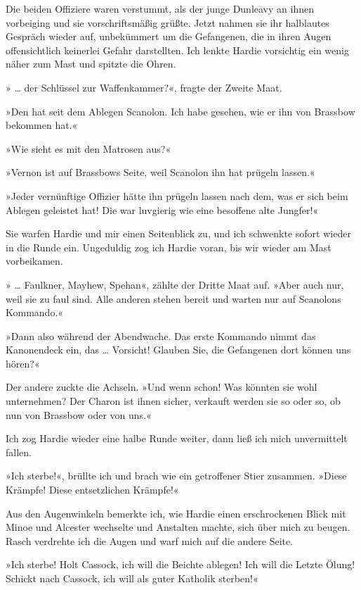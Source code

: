 Die beiden Offiziere waren verstummt, als der junge Dunleavy an
ihnen vorbeiging und sie vorschriftsmäßig grüßte. Jetzt nahmen sie
ihr halblautes Gespräch wieder auf, unbekümmert um die Gefangenen,
die in ihren Augen offensichtlich keinerlei Gefahr darstellten. Ich
lenkte Hardie vorsichtig ein wenig näher zum Mast und spitzte die
Ohren.

» \ldots{} der Schlüssel zur Waffenkammer?«, fragte der Zweite Maat.

»Den hat seit dem Ablegen Scanolon. Ich habe gesehen, wie er ihn
von Brassbow bekommen hat.«

»Wie sieht es mit den Matrosen aus?«

»Vernon ist auf Brassbows Seite, weil Scanolon ihn hat prügeln
lassen.«

»Jeder vernünftige Offizier hätte ihn prügeln lassen nach dem, was
er sich beim Ablegen geleistet hat! Die  war
luvgierig wie eine besoffene alte Jungfer!«

Sie warfen Hardie und mir einen Seitenblick zu, und ich schwenkte
sofort wieder in die Runde ein. Ungeduldig zog ich Hardie voran,
bis wir wieder am Mast vorbeikamen.

» \ldots{} Faulkner, Mayhew, Spehan«, zählte der Dritte Maat auf. »Aber
auch nur, weil sie zu faul sind. Alle anderen stehen bereit und
warten nur auf Scanolons Kommando.«

»Dann also während der Abendwache. Das erste Kommando nimmt das
Kanonendeck ein, das \ldots{} Vorsicht! Glauben Sie, die Gefangenen dort
können uns hören?«

Der andere zuckte die Achseln. »Und wenn schon! Was könnten sie
wohl unternehmen? Der Charon ist ihnen sicher, verkauft werden sie
so oder so, ob nun von Brassbow oder von uns.«

Ich zog Hardie wieder eine halbe Runde weiter, dann ließ ich mich
unvermittelt fallen.

\bigpar

»Ich sterbe!«, brüllte ich und brach wie ein getroffener Stier
zusammen. »Diese Krämpfe! Diese entsetzlichen Krämpfe!«

Aus den Augenwinkeln bemerkte ich, wie Hardie einen erschrockenen
Blick mit Minoe und Alcester wechselte und Anstalten machte, sich
über mich zu beugen. Rasch verdrehte ich die Augen und warf mich
auf die andere Seite.

»Ich sterbe! Holt Cassock, ich will die Beichte ablegen! Ich will
die Letzte Ölung! Schickt nach Cassock, ich will als guter Katholik
sterben!«

